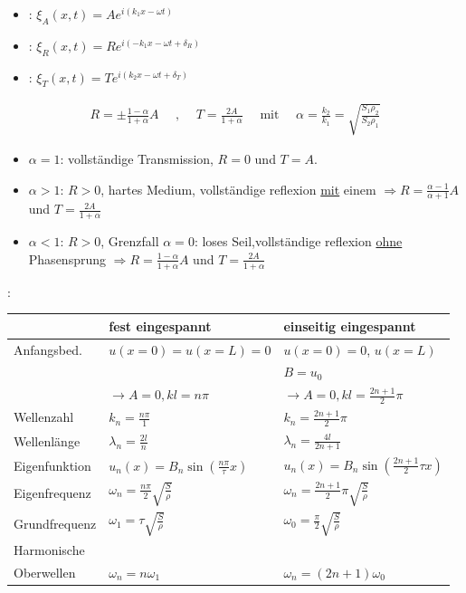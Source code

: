 \begin{itemize}
    \item {}: $\xi_A (x,t) = A e^{i (k_1 x - \omega t)}$
    \item {}: $\xi_R (x,t) = R e^{i(-k_1 x - \omega t + \delta_R)}$
    \item {}: $\xi_T (x,t) = T e^{i (k_2 x - \omega t + \delta_T)}$
\end{itemize}
\begin{align*}
    R = \pm \frac{1 - \alpha}{1+ \alpha} A
    \quad \text{ , } \quad
    T= \frac{2A}{1+\alpha}
    \quad \text{ mit } \quad
    \alpha = \frac{k_2}{k_1} = \sqrt{\frac{S_1 \rho_2}{S_2 \rho_1}}
\end{align*}
\begin{itemize}
    \item $\alpha=1$: vollständige Transmission, $R=0$ und $T=A$.
    \item $\alpha > 1$: $R > 0$, hartes Medium, vollständige reflexion \underline{mit} einem
             $\Rightarrow R=\frac{\alpha - 1}{\alpha + 1} A$ und
            $T = \frac{2A}{1 + \alpha}$
    \item $\alpha<1$: $R > 0$, Grenzfall $\alpha = 0$: loses Seil,vollständige reflexion
            \underline{ohne} Phasensprung $\Rightarrow R = \frac{1-\alpha}{1+\alpha} A$ und
            $T = \frac{2A}{1+ \alpha}$
\end{itemize}

\vspace{1\baselineskip}

:

\vspace{1\baselineskip}

\small
\begin{tabular}{l|l|l}
    \hline \hline & fest eingespannt & einseitig eingespannt \\
    \hline Anfangsbed. & $u(x=0)=u(x=L)=0$ & $u(x=0)=0$, $u(x=L)$ \\
    & & $B=u_{0}$ \\
    & $\rightarrow A=0, k l=n \pi$ & $\rightarrow A=0, k l=\frac{2 n+1}{2} \pi$ \\
    Wellenzahl & $k_{n}=\frac{n \pi}{1}$ & $k_{n}=\frac{2 n+1}{2} \pi$ \\
    Wellenlänge & $\lambda_{n}=\frac{2 l}{n}$ & $\lambda_{n}=\frac{4 l}{2 n+1}$ \\
    Eigenfunktion & $u_{n}(x)=B_{n} \sin \left(\frac{n \pi}{\tau} x\right)$ & $u_{n}(x)=B_{n} \sin \left(\frac{2 n+1}{2} \tau x\right)$ \\
    Eigenfrequenz & $\omega_{n}=\frac{n \pi}{2} \sqrt{\frac{S}{\rho}}$ & $\omega_{n}=\frac{2 n+1}{2} \pi \sqrt{\frac{S}{\rho}}$ \\
    Grundfrequenz & $\omega_{1}=\tau \sqrt{\frac{S}{\rho}}$ & $\omega_{0}=\frac{\pi}{2} \sqrt{\frac{S}{\rho}}$ \\
    Harmonische \\ Oberwellen & $\omega_{n}=n \omega_{1}$ & $\omega_{n}=(2 n+1) \omega_{0}$ \\
    \hline \hline
\end{tabular}
\normalsize

